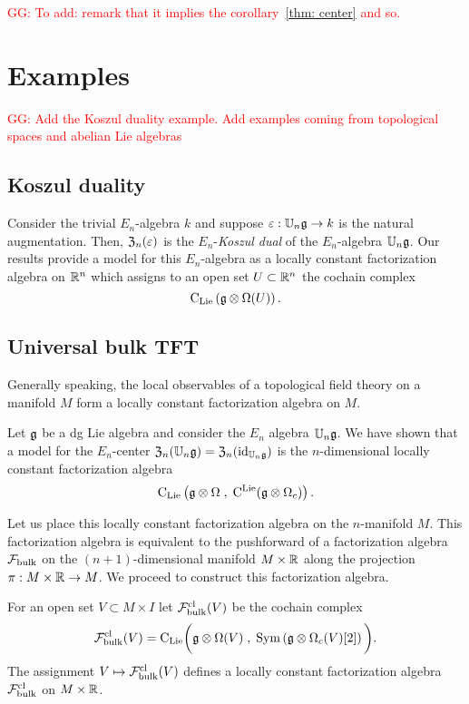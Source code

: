 \documentclass[11pt]{amsart}
\numberwithin{equation}{section}
\def\greg{\textcolor{red}{GG: }\textcolor{red}}
\begin{document}
\greg{To add: remark that it implies the corollary~\ref{thm: center} and so.}


\section{Examples}


\greg{Add the Koszul duality example. Add examples coming from topological spaces and abelian Lie algebras}

\subsection{Koszul duality}
\label{sec: Koszul}

Consider the trivial $E_n$-algebra $k$ and suppose $\varepsilon : \mathbb U_n \mathfrak g \to k$ is the natural augmentation. 
Then, ${\frak Z}_n (\varepsilon)$ is the $E_n$-{\em Koszul dual} of the $E_n$-algebra $\mathbb U_n \mathfrak g$. 
Our results provide a model for this $E_n$-algebra as a locally constant factorization algebra on $\mathbb R^n$ which assigns to an open set $U \subset \mathbb R^n$ the cochain complex
\[
{\rm C}_{{\rm Lie}} \left(\mathfrak g \otimes \Omega(U) \right) .
\]

\subsection{Universal bulk TFT}
\label{sec: TFT}

Generally speaking, the local observables of a topological field theory on a manifold $M$ form a locally constant factorization algebra on $M$. 

Let $\mathfrak g$ be a dg Lie algebra and consider the $E_n$ algebra $\mathbb U_n \mathfrak g$. 
We have shown that a model for the $E_n$-center ${\frak Z}_n (\mathbb U_n \mathfrak g) = {\frak Z}_n ({\rm id}_{\mathbb U_n \mathfrak g})$ is the $n$-dimensional locally constant factorization algebra 
\[
{\rm C}_{{\rm Lie}} \left( \mathfrak g \otimes \Omega \; , \; {\rm C}^{\rm Lie} (\mathfrak g \otimes \Omega_c) \right)  .
\]

Let us place this locally constant factorization algebra on the $n$-manifold $M$.
This factorization algebra is equivalent to the pushforward of a factorization algebra $\mathcal F_{\rm bulk}$ on the $(n+1)$-dimensional manifold $M \times \mathbb R$ along the projection $\pi : M \times \mathbb R \to M$. 
We proceed to construct this factorization algebra. 

For an open set $V \subset M \times I$ let $\mathcal F^{\rm cl}_{\rm bulk} (V)$ be the cochain complex 
\[
\mathcal F^{\rm cl}_{\rm bulk} (V) = {\rm C}_{{\rm Lie}} \bigg(\mathfrak g \otimes \Omega (V) \; , \; {\rm Sym} \left(\mathfrak g \otimes \Omega_c(V) [2] \right) \bigg) .
\]
The assignment $V \mapsto \mathcal F^{\rm cl}_{\rm bulk}(V)$ defines a locally constant factorization algebra $\mathcal F^{\rm cl}_{\rm bulk}$ on $M \times \mathbb R$. 
\end{document}

